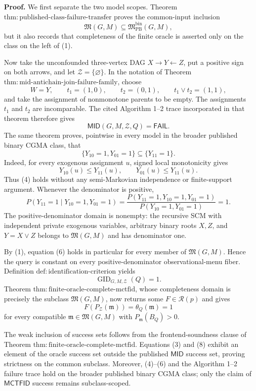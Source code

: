 \textbf{Proof.}
We first separate the two model scopes.  Theorem \(\mathrm{thm:published\text{-}class\text{-}failure\text{-}transfer}\) proves the common-input inclusion
\[
 \mathfrak M(G,M)\subseteq
 \mathfrak M_{\mathrm{PB}}^{\mathrm{bin}}(G,M),
\tag{1}
\]
but it also records that completeness of the finite oracle is asserted only on the class on the left of (1).

Now take the unconfounded three-vertex DAG \(X\to Y\leftarrow Z\), put a positive sign on both arrows, and let \(\mathcal Z=\{\varnothing\}\).  In the notation of Theorem \(\mathrm{thm:mid\text{-}antichain\text{-}join\text{-}failure\text{-}family}\), choose
\[
 W=Y,
 \qquad
 t_1=(1,0),
 \qquad
 t_2=(0,1),
 \qquad
 t_1\vee t_2=(1,1),
\tag{2}
\]
and take the assignment of nonmonotone parents to be empty.  The assignments \(t_1\) and \(t_2\) are incomparable.  The cited Algorithm 1--2 trace incorporated in that theorem therefore gives
\[
 \mathsf{MID}(G,M,\mathcal Z,Q)=\mathsf{FAIL}.
\tag{3}
\]
The same theorem proves, pointwise in every model in the broader published binary CGMA class, that
\[
 \{Y_{10}=1,Y_{01}=1\}
 \subseteq
 \{Y_{11}=1\}.
\tag{4}
\]
Indeed, for every exogenous assignment \(u\), signed local monotonicity gives
\[
 Y_{10}(u)\le Y_{11}(u),
 \qquad
 Y_{01}(u)\le Y_{11}(u).
\tag{5}
\]
Thus (4) holds without any semi-Markovian independence or finite-support argument.  Whenever the denominator is positive,
\[
 P(Y_{11}=1\mid Y_{10}=1,Y_{01}=1)
 =\frac{P(Y_{11}=1,Y_{10}=1,Y_{01}=1)}
 {P(Y_{10}=1,Y_{01}=1)}
 =1.
\tag{6}
\]
The positive-denominator domain is nonempty: the recursive SCM with independent private exogenous variables, arbitrary binary roots \(X,Z\), and \(Y=X\lor Z\) belongs to \(\mathfrak M(G,M)\) and has denominator one.

By (1), equation (6) holds in particular for every member of \(\mathfrak M(G,M)\).  Hence the query is constant on every positive-denominator observational-menu fiber.  Definition \(\mathrm{def:identification\text{-}criterion}\) yields
\[
 \operatorname{GID}_{G,M,\mathcal Z}(Q)=1.
\tag{7}
\]
Theorem \(\mathrm{thm:finite\text{-}oracle\text{-}complete\text{-}mctfid}\), whose completeness domain is precisely the subclass \(\mathfrak M(G,M)\), now returns some \(F\in\mathcal R(p)\) and gives
\[
 F(P_{\mathcal Z}(\mathfrak m))
 =\theta_Q(\mathfrak m)
 =1
\tag{8}
\]
for every compatible \(\mathfrak m\in\mathfrak M(G,M)\) with \(P_{\mathfrak m}(B_Q)>0\).

The weak inclusion of success sets follows from the frontend-soundness clause of Theorem \(\mathrm{thm:finite\text{-}oracle\text{-}complete\text{-}mctfid}\).  Equations (3) and (8) exhibit an element of the oracle success set outside the published \(\mathsf{MID}\) success set, proving strictness on the common subclass.  Moreover, (4)--(6) and the Algorithm 1--2 failure trace hold on the broader published binary CGMA class; only the claim of \(\mathsf{MCTFID}\) success remains subclass-scoped.

